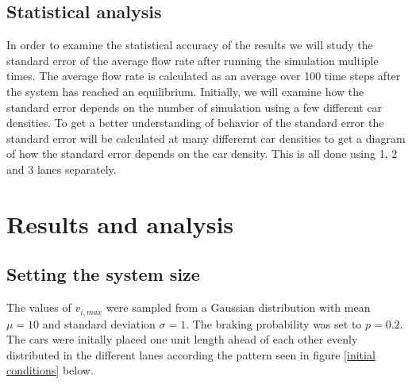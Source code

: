 \documentclass[a4paper,12pt]{article}
\begin{document}
\subsection*{Statistical analysis}
In order to examine the statistical accuracy of the results we will study the standard error of the average flow rate after running the simulation multiple times. 
The average flow rate is calculated as an average over 100 time steps after the system has reached an equilibrium. Initially, we will examine how the standard error
depends on the number of simulation using a few different car densities. To get a better understanding of behavior of the standard error the standard error will be calculated
at many differernt car densities to get a diagram of how the standard error depends on the car density. This is all done using 1, 2 and 3 lanes separately.



\section*{Results and analysis}
\subsection*{Setting the system size}
The values of $v_{i,max}$ were sampled from a Gaussian distribution with mean $\mu = 10$ and standard deviation $\sigma = 1$. The braking probability
was set to $p=0.2$. The cars were initally placed one unit length ahead of each other evenly distributed in the different lanes according the 
pattern seen in figure \ref*{initial conditions} below.
\end{document}
